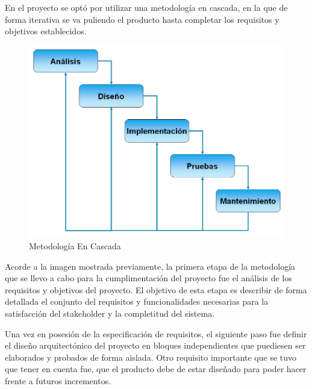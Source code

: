 \documentclass[a4paper,12pt]{book}
\begin{document}
	 	\vspace{5mm}
	 	
	 	
	 	En el proyecto se optó por utilizar una metodología en cascada, en la que de forma iterativa se va puliendo el producto hasta completar los requisitos y objetivos establecidos.
	 	
	 	\vspace{5mm}
	 	
	 	\begin{figure}[h]
	 		\centering
	 		\includegraphics[scale=0.5]{modelo-en-cascada.png}
	 		\caption{Metodología En Cascada}\label{fig:modelo-en-cascada}
	 	\end{figure}
 	
 		\vspace{5mm}
 	
 		Acorde a la imagen mostrada previamente, la primera etapa de la metodología que se llevo a cabo para la cumplimentación del proyecto fue el análisis de los requisitos y objetivos del proyecto. El objetivo de esta etapa es describir de forma detallada el conjunto del requisitos y funcionalidades necesarias para la satisfacción del stakeholder y la completitud del sistema.
 		
 		\vspace{5mm}
 		
 		Una vez en posesión de la especificación de requisitos, el siguiente paso fue definir el diseño arquitectónico del proyecto en bloques independientes que puediesen ser elaborados y probados de forma aislada. Otro requisito importante que se tuvo que tener en cuenta fue, que el producto debe de estar diseñado para poder hacer frente a futuros incrementos.
 		
\end{document}
